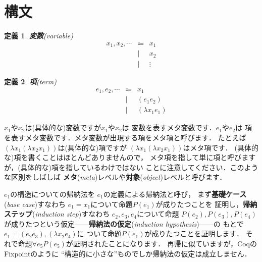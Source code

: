\documentclass{ltjsbook}%
\newtheorem{definition}{定義}[section]%
\newcommand\term[2]{\textbf{#1}{(\textit{#2})}}%
\begin{document}
\section{構文}%
\label{untyped:syntax}%
\begin{definition}%
  \par\term{変数}{variable}%
  \begin{equation}%
    \begin{array}{lrl}%
      \mathit{x}_1,\mathit{x}_2,\cdots%
      & \Coloneqq & x_1\\%
      &         | & x_2\\%
      &         | & \vdots%
    \end{array}%
  \end{equation}%
\end{definition}%
\begin{definition}%
\term{項}{term}%
\begin{equation}%
  \begin{array}{lrl}%
    \mathit{e}_1,\mathit{e}_2,\cdots%
    & \Coloneqq & \mathit{x}_1\\%
    &         | & (\mathit{e}_1\mathit{e}_2)\\%
    &         | & (\lambda\mathit{x}_1\mathit{e}_1)%
  \end{array}%
\end{equation}%
\end{definition}%
\par$x_1$や$x_2$は(具体的な)変数ですが$\mathit{x}_1$や$\mathit{x}_2$は%
変数を表すメタ変数です．$\mathit{e}_1$や$\mathit{e}_2$は%
項を表すメタ変数です．メタ変数が出現する項をメタ項と呼びます．%
たとえば$(\lambda x_1(\lambda x_2x_1))$は(具体的な)項ですが%
$(\lambda\mathit{x}_1(\lambda\mathit{x}_2\mathit{x}_1))$はメタ項です．%
(具体的な)項を書くことはほとんどありませんので，%
メタ項を指して単に項と呼びますが，(具体的な)項を指しているわけではない%
ことに注意してください．このような区別をしばしば%
\term{メタ}{meta}レベルや\term{対象}{object}レベルと呼びます．%
\par$\mathit{e}_1$の構造についての帰納法を%
$\mathit{e}_1$の定義による帰納法と呼び，%
まず\term{基礎ケース}{base case}すなわち%
$\mathit{e}_1 = \mathit{x}_1$について命題$P(\mathit{e}_1)$が成りたつことを%
証明し，\term{帰納ステップ}{induction step}すなわち%
$\mathit{e}_2,\mathit{e}_3,\mathit{e}_4$について命題%
$P(\mathit{e}_2),P(\mathit{e}_3),P(\mathit{e}_4)$%
が成りたつという仮定------\term{帰納法の仮定}{induction hypothesis}------の%
もとで%
$\mathit{e}_1 = (\mathit{e}_2\mathit{e}_3),(\lambda\mathit{x}_2\mathit{e}_4)$に%
ついて命題$P(\mathit{e}_1)$が成りたつことを証明します．%
それで命題$\forall\mathit{e}_5P(\mathit{e}_5)$が証明されたことになります．%
再帰に似ていますが，CoqのFixpointのように%
``構造的に小さな''ものでしか帰納法の仮定は成立しません．%
\end{document}
